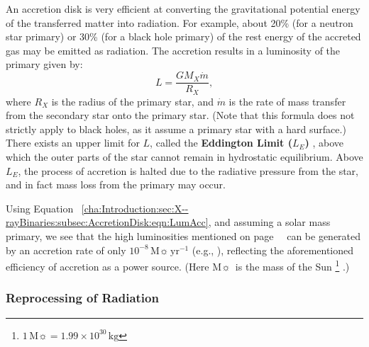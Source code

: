 \vspace{\myparskip}

An accretion disk is very efficient at converting the gravitational potential energy of the transferred matter into radiation. For example, about 20\% (for a neutron star primary) or 30\% (for a
black hole primary) of the rest energy of the accreted gas may be
emitted as radiation. The accretion results in a luminosity of the primary given by:
\begin{equation} 
\label{cha:Introduction:sec:X--rayBinaries:subsec:AccretionDisk:eqn:LumAcc}
L = \frac{G M_X \dot{m}}{R_X},
\end{equation}
where $R_X$ is the radius of the primary star, and $\dot{m}$ is the
rate of mass transfer from the secondary star onto the primary star. %
(Note that this formula does not strictly apply to black holes, as it assume a
primary star with a hard surface.) %
There exists an upper limit for $L$, called the \textbf{Eddington
Limit ($L_{E}$)}%
\label{cha:Introduction:sec:BinaryStarSystems:subsec:AccretionDisk:topic:L_E}%
, above which the outer parts of the star cannot remain in hydrostatic
equilibrium. Above $L_{E}$, the process of accretion is halted due to
the radiative pressure from the star, and in fact mass loss from the primary may occur. %

\vspace{\myparskip}

Using Equation~%
\vref{cha:Introduction:sec:X--rayBinaries:subsec:AccretionDisk:eqn:LumAcc}, %
and assuming a solar mass primary, we see
that the high luminosities mentioned on page~%
\pageref{cha:Introduction:sec:X--rayBinaries:subsec:CompactObjects:topic:HighLum}%
\ can be generated by an accretion rate of
only $10^{-8}\,\mathrm{M}\sun\,\mathrm{yr^{-1}}$ (e.g., %
%
), %
reflecting the aforementioned efficiency of accretion as a power
source. (Here $\mathrm{M}\sun$\ is the mass of the Sun%
\footnote{%
\label{cha:Introduction:sec:X--rayBinaries:foot:Msun}
$1\,\mathrm{M}\sun = 1.99 \times 10^{30}\,\mathrm{kg}$}%
.)


\subsubsection{Reprocessing of Radiation}
\label{cha:Introduction:sec:X--rayBinaries:subsec:AccretionDisk:subsubsec:ReprocessingOfRadiation}

